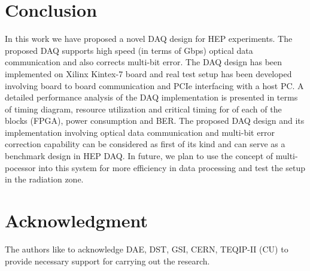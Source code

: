 \documentclass[10pt, conference, compsocconf]{IEEEtran}
\begin{document}
\section{Conclusion}\label{Conclusion}
In this work we have proposed a novel DAQ design for HEP experiments. The proposed DAQ supports high speed (in terms of Gbps) optical data communication and also corrects multi-bit error. The DAQ design has been implemented on Xilinx Kintex-7 board and real test setup has been developed involving board to board communication and PCIe interfacing with a host PC. A detailed performance analysis of the DAQ implementation is presented in terms of timing diagram, resource utilization and critical timing for of each of the blocks (FPGA), power consumption and BER. The proposed DAQ design and its implementation involving optical data communication and multi-bit error correction capability can be considered as first of its kind and can serve as a benchmark design in HEP DAQ.  In future, we plan to use the concept of multi-pocessor into this system for more efficiency in data processing and test the setup in the radiation zone. 
\section*{Acknowledgment}
The authors like to acknowledge  DAE, DST, GSI, CERN, TEQIP-II (CU) to provide necessary support for carrying out the research.







  
\end{document}
